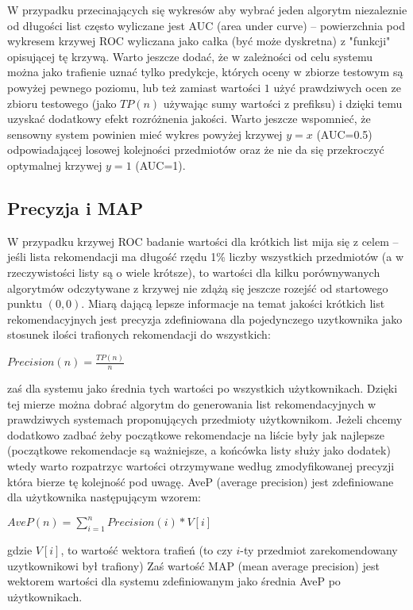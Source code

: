 \documentclass{pracamgr}
\begin{document}
    W przypadku przecinających się wykresów aby wybrać jeden algorytm niezaleznie od długości list często wyliczane jest AUC (area under curve) --
    powierzchnia pod wykresem krzywej ROC wyliczana jako całka (być może dyskretna) z "funkcji" opisującej tę krzywą.
    Warto jeszcze dodać, że w zależności od celu systemu można jako trafienie uznać tylko predykcje, których oceny w zbiorze testowym są powyżej pewnego poziomu,
    lub też zamiast wartości $1$ użyć prawdziwych ocen ze zbioru testowego (jako $TP(n)$ używając sumy wartości z prefiksu)
    i dzięki temu uzyskać dodatkowy efekt rozróżnenia jakości.
    Warto jeszcze wspomnieć, że sensowny system powinien mieć wykres powyżej krzywej $y=x$ (AUC=0.5) odpowiadającej losowej kolejności przedmiotów
    oraz że nie da się przekroczyć optymalnej krzywej $y=1$ (AUC=1).
   \subsection{Precyzja i MAP}
    W przypadku krzywej ROC badanie wartości dla krótkich list mija się z celem -- jeśli lista rekomendacji ma długość rzędu 1\% liczby wszystkich przedmiotów
    (a w rzeczywistości listy są o wiele krótsze), to wartości dla kilku porównywanych algorytmów odczytywane
    z krzywej nie zdążą się jeszcze rozejść od startowego punktu $(0,0)$.\newline
    Miarą dającą lepsze informacje na temat jakości krótkich list rekomendacyjnych jest
    precyzja zdefiniowana dla pojedynczego uzytkownika jako stosunek ilości trafionych rekomendacji do wszystkich:
    \begin{center}
     $Precision(n)=\frac{TP(n)}{n}$
    \end{center}
    zaś dla systemu jako średnia tych wartości po wszystkich użytkownikach.\newline
    Dzięki tej mierze można dobrać algorytm do generowania list rekomendacyjnych w prawdziwych systemach proponujących przedmioty użytkownikom.
    Jeżeli chcemy dodatkowo zadbać żeby początkowe rekomendacje na liście były jak najlepsze
    (początkowe rekomendacje są ważniejsze, a końcówka listy służy jako dodatek) wtedy warto rozpatrzyc wartości otrzymywane według zmodyfikowanej precyzji
    która bierze tę kolejność pod uwagę.
    AveP (average precision) jest zdefiniowane dla użytkownika następującym wzorem:
    \begin{center}
     $AveP(n)=\sum\limits_{i=1}^{n}Precision(i)*V[i]$
    \end{center} 
    {\scriptsize
     gdzie $V[i]$, to wartość wektora trafień (to czy $i$-ty przedmiot zarekomendowany uzytkownikowi był trafiony)
    }\newline
    Zaś wartość MAP (mean average precision) jest wektorem wartości dla systemu zdefiniowanym jako średnia AveP po użytkownikach.
\end{document}
